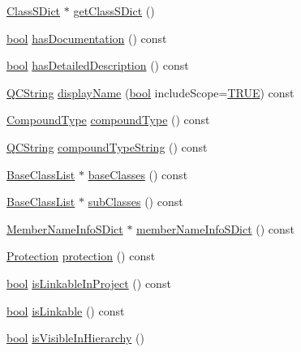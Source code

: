 \begin{DoxyCompactItemize}
\item 
\hyperlink{class_class_s_dict}{Class\+S\+Dict} $\ast$ \hyperlink{class_class_def_af92dc88df93d5529ffdc26222c890345}{get\+Class\+S\+Dict} ()
\item 
\hyperlink{qglobal_8h_a1062901a7428fdd9c7f180f5e01ea056}{bool} \hyperlink{class_class_def_ab753d57a3b39906b612a8c81a1b93f1e}{has\+Documentation} () const 
\item 
\hyperlink{qglobal_8h_a1062901a7428fdd9c7f180f5e01ea056}{bool} \hyperlink{class_class_def_a04dac0221a7560f31d424503bb66b4b0}{has\+Detailed\+Description} () const 
\item 
\hyperlink{class_q_c_string}{Q\+C\+String} \hyperlink{class_class_def_a4c1949b6fda5e47ec3fea0e046df5f7b}{display\+Name} (\hyperlink{qglobal_8h_a1062901a7428fdd9c7f180f5e01ea056}{bool} include\+Scope=\hyperlink{qglobal_8h_a04a6422a52070f0dc478693da640242b}{T\+R\+U\+E}) const 
\item 
\hyperlink{class_class_def_ae70cf86d35fe954a94c566fbcfc87939}{Compound\+Type} \hyperlink{class_class_def_a8f62fc9906e829a1afdba79beddeb4b2}{compound\+Type} () const 
\item 
\hyperlink{class_q_c_string}{Q\+C\+String} \hyperlink{class_class_def_a2e2c5900a55d6594678f35ea0f77631e}{compound\+Type\+String} () const 
\item 
\hyperlink{class_base_class_list}{Base\+Class\+List} $\ast$ \hyperlink{class_class_def_a7f2e3c9d1a1e5f4bcc4bcdfc06a06bc7}{base\+Classes} () const 
\item 
\hyperlink{class_base_class_list}{Base\+Class\+List} $\ast$ \hyperlink{class_class_def_ae230c3a3d93cc56b7e467eacd7dca90a}{sub\+Classes} () const 
\item 
\hyperlink{class_member_name_info_s_dict}{Member\+Name\+Info\+S\+Dict} $\ast$ \hyperlink{class_class_def_a1dfaf495dfdfa1e23a19704c22784f98}{member\+Name\+Info\+S\+Dict} () const 
\item 
\hyperlink{types_8h_a90e352184df58cd09455fe9996cd4ded}{Protection} \hyperlink{class_class_def_afb5695813ec0a4ea9decdc236f0e03d7}{protection} () const 
\item 
\hyperlink{qglobal_8h_a1062901a7428fdd9c7f180f5e01ea056}{bool} \hyperlink{class_class_def_acb4255cf08ddb71608af6467b6850783}{is\+Linkable\+In\+Project} () const 
\item 
\hyperlink{qglobal_8h_a1062901a7428fdd9c7f180f5e01ea056}{bool} \hyperlink{class_class_def_a1ea1c676588739bbabf189cf2b343c56}{is\+Linkable} () const 
\item 
\hyperlink{qglobal_8h_a1062901a7428fdd9c7f180f5e01ea056}{bool} \hyperlink{class_class_def_ae7dbada34949e6f0a60a8176485c3319}{is\+Visible\+In\+Hierarchy} ()

\end{DoxyCompactItemize}
